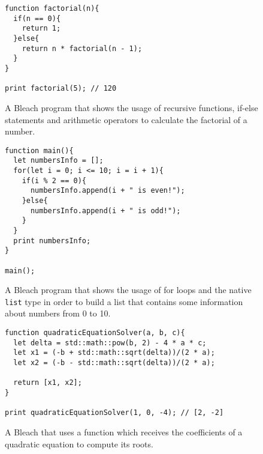 \begin{figure}
    \centering
    \begin{lstlisting}
function factorial(n){
  if(n == 0){
    return 1;
  }else{
    return n * factorial(n - 1);
  }
}

print factorial(5); // 120
    \end{lstlisting}
    \caption{A Bleach program that shows the usage of recursive functions, if-else statements and arithmetic operators to calculate the factorial of a number.}
\end{figure}

\begin{figure}
    \centering
    \begin{lstlisting}
function main(){
  let numbersInfo = [];
  for(let i = 0; i <= 10; i = i + 1){
    if(i % 2 == 0){
      numbersInfo.append(i + " is even!");
    }else{
      numbersInfo.append(i + " is odd!");
    }
  }
  print numbersInfo;
}

main();
    \end{lstlisting}
    \caption{A Bleach program that shows the usage of for loops and the native \texttt{list} type in order to build a list that contains some information about numbers from 0 to 10.}
\end{figure}

\begin{figure}
    \centering
    \begin{lstlisting}
function quadraticEquationSolver(a, b, c){
  let delta = std::math::pow(b, 2) - 4 * a * c;
  let x1 = (-b + std::math::sqrt(delta))/(2 * a);
  let x2 = (-b - std::math::sqrt(delta))/(2 * a);

  return [x1, x2];
}

print quadraticEquationSolver(1, 0, -4); // [2, -2]
    \end{lstlisting}
    \caption{A Bleach that uses a function which receives the coefficients of a quadratic equation to compute its roots.}
\end{figure}

